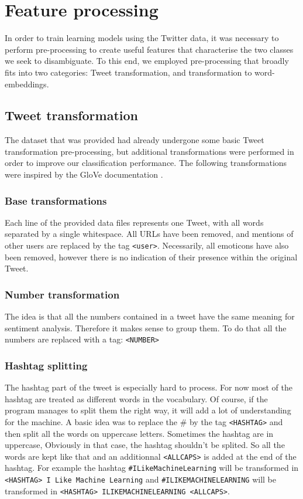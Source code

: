 \section{Feature processing}
\label{sec:processing}
In order to train learning models using the Twitter data, it was necessary to perform pre-processing to create useful features that characterise the two classes we seek to disambiguate. To this end, we employed pre-processing that broadly fits into two categories: Tweet transformation, and transformation to word-embeddings.

\subsection{Tweet transformation}
The dataset that was provided had already undergone some basic Tweet transformation pre-processing, but additional transformations were performed in order to improve our classification performance. The following transformations were inspired by the GloVe documentation \cite{pennington2014glove}.

\subsubsection{Base transformations}
Each line of the provided data files represents one Tweet, with all words separated by a single whitespace. All URLs have been removed, and mentions of other users are replaced by the tag \texttt{<user>}. Necessarily, all emoticons have also been removed, however there is no indication of their presence within the original Tweet.

\subsubsection{Number transformation}
The idea is that all the numbers contained in a tweet have the same meaning for sentiment analysis. Therefore it makes sense to group them. To do that all the numbers are replaced with a tag: \texttt{<NUMBER>}

\subsubsection{Hashtag splitting}
The hashtag part of the tweet is especially hard to process. For now most of the hashtag are treated as different words in the vocabulary. Of course, if the program manages to split them the right way, it will add a lot of understanding for the machine. A basic idea was to replace the \# by the tag \texttt{<HASHTAG>} and then split all the words on uppercase letters. Sometimes the hashtag are in uppercase, Obviously in that case, the hashtag shouldn't be splited. So all the words are kept like that and an additionnal \texttt{<ALLCAPS>} is added at the end of the hashtag. For example the hashtag \texttt{\#ILikeMachineLearning} will be transformed in \texttt{<HASHTAG> I Like Machine Learning} and \texttt{\#ILIKEMACHINELEARNING} will be transformed in \texttt{<HASHTAG> ILIKEMACHINELEARNING <ALLCAPS>}. 


